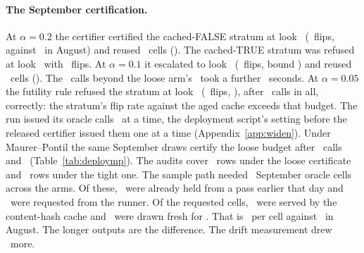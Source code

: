 \paragraph{The September certification.} At $\alpha{=}0.2$ the
certifier certified the cached-FALSE stratum
at look \sepLookLoose\ (\sepFlipsLoose\ flips, against
\deployFlipsLoose\ in August) and reused \sepReusedLoose\ cells
(\sepSavingsLoose).
The cached-TRUE stratum was refused at look \sepTrueLook\ with
\sepTrueFlips\ flips. At $\alpha{=}0.1$ it escalated to look
\sepLookTight\ (\sepFlipsTight\ flips, bound \sepBoundTight) and
reused \sepReusedTight\ cells
(\sepSavingsTight). The \sepTightExtraDraws\ calls beyond the loose
arm's \sepOracleLoose\ took a further \sepWallTight\ seconds. At
$\alpha{=}0.05$ the futility rule refused the stratum at
look \sepLookFive\ (\sepFlipsFive\ flips, \sepRateFive), after
\sepOracleFive\ calls in all, correctly: the stratum's flip rate against
the aged cache exceeds that budget. The run issued its oracle calls
\deployConcurrency\ at a time, the deployment script's setting before
the released certifier issued them one at a time
(Appendix~\ref{app:widen}). Under
Maurer--Pontil the same September draws
certify the loose budget after \sepMpOracleLoose\ calls and
\sepMpTightOutcome\ (Table~\ref{tab:deploymp}). The audits cover
\sepAuditRowsLoose\ rows under
the loose certificate and \sepAuditRowsTight\ rows under the tight
one. The sample path needed \sepOracleCellsNeeded\ September oracle
cells across the arms. Of these, \sepStoredBefore\ were already held
from a pass earlier that day and \sepLiveRequested\ were requested
from the runner. Of the requested cells, \sepLiveCached\ were
served by the content-hash cache and \sepLiveDraws\ were
drawn fresh for \sepLedgerUsd. That is \sepPerCell\ per cell
against \perCellCost\ in August. The longer outputs are the
difference. The drift measurement drew \driftLiveDraws\ more.

\keeprunin
